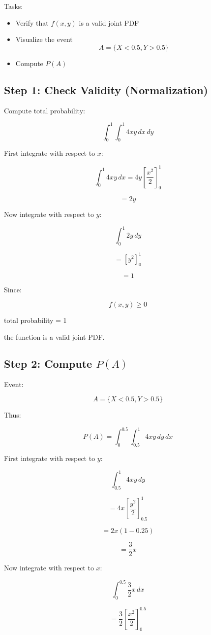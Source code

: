 \documentclass[12pt]{article}
\begin{document}
Tasks:

\begin{itemize}
\item Verify that $f(x,y)$ is a valid joint PDF
\item Visualize the event
\[
A=\{X<0.5,Y>0.5\}
\]
\item Compute $P(A)$
\end{itemize}

\subsection*{Step 1: Check Validity (Normalization)}

Compute total probability:

\[
\int_{0}^{1}\int_{0}^{1} 4xy\,dx\,dy
\]

First integrate with respect to $x$:

\[
\int_{0}^{1}4xy\,dx = 4y\left[\frac{x^2}{2}\right]_{0}^{1}
\]

\[
=2y
\]

Now integrate with respect to $y$:

\[
\int_{0}^{1}2y\,dy
\]

\[
=[y^2]_{0}^{1}
\]

\[
=1
\]

Since:

\[
f(x,y) \ge 0
\]

total probability = 1

the function is a valid joint PDF.

\subsection*{Step 2: Compute $P(A)$}

Event:

\[
A=\{X<0.5,Y>0.5\}
\]

Thus:

\[
P(A)=\int_{0}^{0.5}\int_{0.5}^{1}4xy\,dy\,dx
\]

First integrate with respect to $y$:

\[
\int_{0.5}^{1}4xy\,dy
\]

\[
=4x\left[\frac{y^2}{2}\right]_{0.5}^{1}
\]

\[
=2x(1-0.25)
\]

\[
=\frac{3}{2}x
\]

Now integrate with respect to $x$:

\[
\int_{0}^{0.5}\frac{3}{2}x\,dx
\]

\[
=\frac{3}{2}\left[\frac{x^2}{2}\right]_{0}^{0.5}
\]
\end{document}
